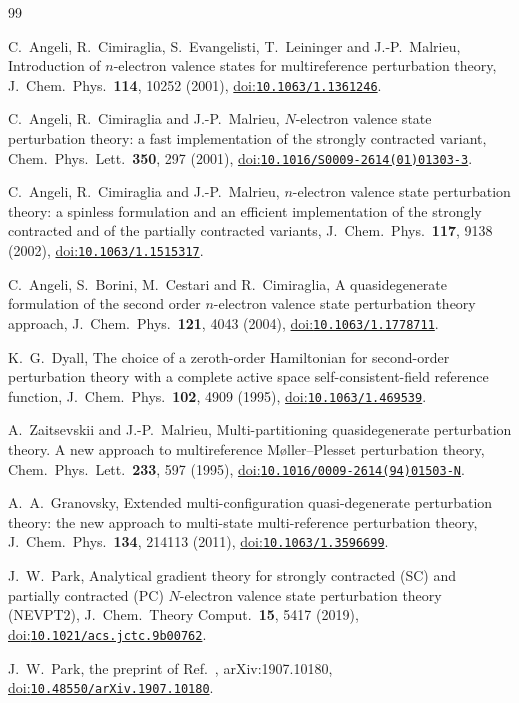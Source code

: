 \documentclass[11pt]{article}
\newcommand{\doi}[1]{\href{https://doi.org/#1}{doi:\nolinkurl{#1}}}
\begin{document}
\begin{thebibliography}{99}

C.~Angeli, R.~Cimiraglia, S.~Evangelisti, T.~Leininger and J.-P.~Malrieu,
Introduction of $n$-electron valence states for multireference perturbation
theory, J.~Chem.\ Phys.\ \textbf{114}, 10252 (2001),
\doi{10.1063/1.1361246}.

C.~Angeli, R.~Cimiraglia and J.-P.~Malrieu, $N$-electron valence state
perturbation theory: a fast implementation of the strongly contracted
variant, Chem.\ Phys.\ Lett.\ \textbf{350}, 297 (2001),
\doi{10.1016/S0009-2614(01)01303-3}.

C.~Angeli, R.~Cimiraglia and J.-P.~Malrieu, $n$-electron valence state
perturbation theory: a spinless formulation and an efficient implementation
of the strongly contracted and of the partially contracted variants,
J.~Chem.\ Phys.\ \textbf{117}, 9138 (2002), \doi{10.1063/1.1515317}.

C.~Angeli, S.~Borini, M.~Cestari and R.~Cimiraglia, A quasidegenerate
formulation of the second order $n$-electron valence state perturbation
theory approach, J.~Chem.\ Phys.\ \textbf{121}, 4043 (2004),
\doi{10.1063/1.1778711}.

K.~G.~Dyall, The choice of a zeroth-order Hamiltonian for second-order
perturbation theory with a complete active space self-consistent-field
reference function, J.~Chem.\ Phys.\ \textbf{102}, 4909 (1995),
\doi{10.1063/1.469539}.

A.~Zaitsevskii and J.-P.~Malrieu, Multi-partitioning quasidegenerate
perturbation theory. A new approach to multireference M{\o}ller--Plesset
perturbation theory, Chem.\ Phys.\ Lett.\ \textbf{233}, 597 (1995),
\doi{10.1016/0009-2614(94)01503-N}.

A.~A.~Granovsky, Extended multi-configuration quasi-degenerate perturbation
theory: the new approach to multi-state multi-reference perturbation theory,
J.~Chem.\ Phys.\ \textbf{134}, 214113 (2011), \doi{10.1063/1.3596699}.

J.~W.~Park, Analytical gradient theory for strongly contracted (SC) and
partially contracted (PC) $N$-electron valence state perturbation theory
(NEVPT2), J.~Chem.\ Theory Comput.\ \textbf{15}, 5417 (2019),
\doi{10.1021/acs.jctc.9b00762}.

J.~W.~Park, the preprint of Ref.~\cite{park2019}, arXiv:1907.10180,
\doi{10.48550/arXiv.1907.10180}.


\end{thebibliography}
\end{document}

